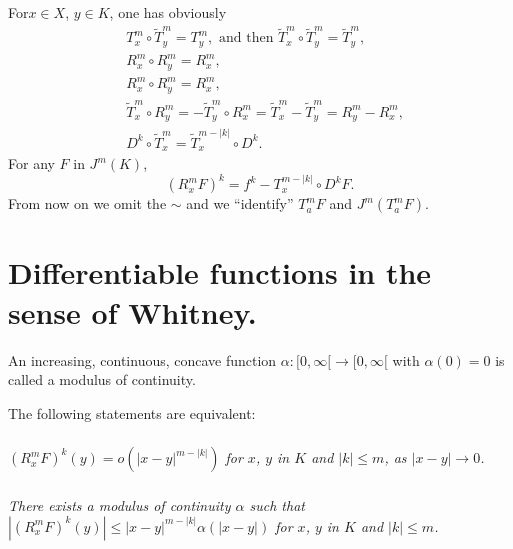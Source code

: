 \eject

For\pageoriginale $x\in X$, $y\in K$, one has obviously
\begin{align}
& T^{m}_{x}\circ \widetilde{T}^{m}_{y}=T^{m}_{y},\text{ and then } \widetilde{T}^{m}_{x}\circ \widetilde{T}^{m}_{y}=\widetilde{T}^{m}_{y},\label{chap1-eq1.1}\\
& R^{m}_{x}\circ R^{m}_{y}=R^{m}_{x},\label{chap1-eq1.2}\\
& R^{m}_{x}\circ R^{m}_{y}=R^{m}_{x},\label{chap1-eq1.3}\\
& \widetilde{T}^{m}_{x}\circ R^{m}_{y}=-\widetilde{T}^{m}_{y}\circ R^{m}_{x}=\widetilde{T}^{m}_{x}-\widetilde{T}^{m}_{y}=R^{m}_{y}-R^{m}_{x},\label{chap1-eq1.4}\\
& D^{k}\circ \widetilde{T}^{m}_{x}=\widetilde{T}^{m-|k|}_{x}\circ D^{k}.\label{chap1-eq1.5}
\end{align}
For any $F$ in $J^{m}(K)$,
\begin{equation}
(R^{m}_{x}F)^{k}=f^{k}-T^{m-|k|}_{x}\circ D^{k}F.\label{chap1-eq1.6}
\end{equation}
From now on we omit the $\sim$ and we ``identify'' $T^{m}_{a}F$ and $J^{m}(T^{m}_{a}F)$.

\section[Differentiable functions in the sense of Whitney]{Differentiable functions in the sense of Whitney.}\label{chap1-sec2}

\begin{definition}\label{chap1-defi2.1}
An increasing, continuous, concave function $\alpha:[0,\infty[\to [0,\infty[$ with $\alpha(0)=0$ is called a modulus of continuity.
\end{definition}

\begin{theorem}\label{chap1-thm2.2}
The following statements are equivalent:
\end{theorem}

\setcounter{subsection}{2}
\subsubsection{}\label{chap1-sec2.2.1}
{\em $(R^{m}_{x}F)^{k}(y)=o(|x-y|^{m-|k|})$ for $x$, $y$ in $K$ and $|k|\leq m$, as $|x-y|\to 0$.}

\subsubsection{}\label{chap1-sec2.2.2}
{\em There exists a modulus of continuity $\alpha$ such that $|(R^{m}_{x}F)^{k}(y)|\leq |x-y|^{m-|k|}\alpha(|x-y|)$ for $x$, $y$ in $K$ and $|k|\leq m$.}

